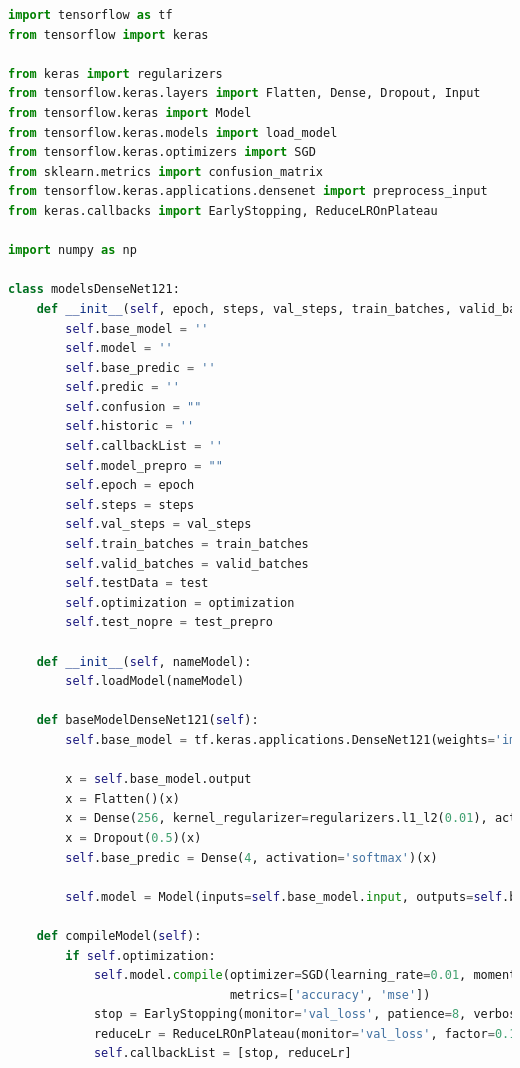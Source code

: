﻿\documentclass[10pt,a4paper,twocolumn,twoside]{article}
\begin{document}
\begin{lstlisting}[language=Python]
import tensorflow as tf
from tensorflow import keras

from keras import regularizers
from tensorflow.keras.layers import Flatten, Dense, Dropout, Input
from tensorflow.keras import Model
from tensorflow.keras.models import load_model
from tensorflow.keras.optimizers import SGD
from sklearn.metrics import confusion_matrix
from tensorflow.keras.applications.densenet import preprocess_input
from keras.callbacks import EarlyStopping, ReduceLROnPlateau

import numpy as np

class modelsDenseNet121:
    def __init__(self, epoch, steps, val_steps, train_batches, valid_batches, test, test_prepro, optimization=False):
        self.base_model = ''
        self.model = ''
        self.base_predic = ''
        self.predic = ''
        self.confusion = ""
        self.historic = ''
        self.callbackList = ''
        self.model_prepro = ""
        self.epoch = epoch
        self.steps = steps
        self.val_steps = val_steps
        self.train_batches = train_batches
        self.valid_batches = valid_batches
        self.testData = test
        self.optimization = optimization
        self.test_nopre = test_prepro

    def __init__(self, nameModel):
        self.loadModel(nameModel)

    def baseModelDenseNet121(self):
        self.base_model = tf.keras.applications.DenseNet121(weights='imagenet', include_top=False, pooling='avg')

        x = self.base_model.output
        x = Flatten()(x)
        x = Dense(256, kernel_regularizer=regularizers.l1_l2(0.01), activity_regularizer=regularizers.l2(0.01), activation='relu')(x)
        x = Dropout(0.5)(x)
        self.base_predic = Dense(4, activation='softmax')(x)

        self.model = Model(inputs=self.base_model.input, outputs=self.base_predic)

    def compileModel(self):
        if self.optimization:
            self.model.compile(optimizer=SGD(learning_rate=0.01, momentum=0.9), loss='categorical_crossentropy',
                               metrics=['accuracy', 'mse'])
            stop = EarlyStopping(monitor='val_loss', patience=8, verbose=1, min_delta=1e-4)
            reduceLr = ReduceLROnPlateau(monitor='val_loss', factor=0.1, patience=2, verbose=1, min_delta=1e-6)
            self.callbackList = [stop, reduceLr]


\end{lstlisting}
\end{document}
